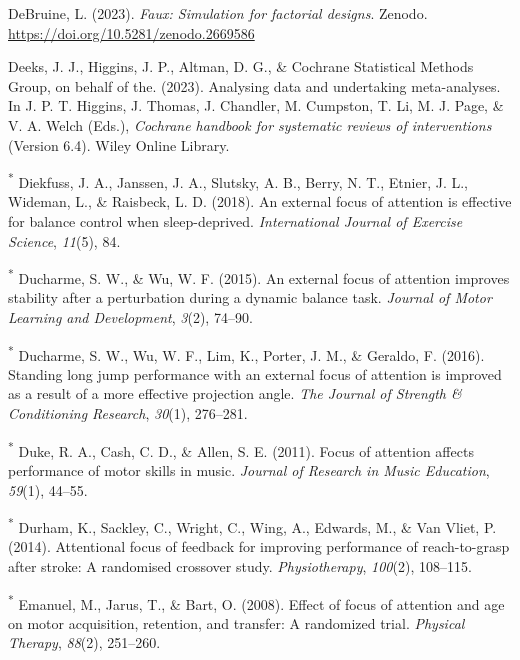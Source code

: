 \documentclass[
  man, donotrepeattitle,floatsintext]{apa7}
\newlength{\cslhangindent}
\newlength{\cslentryspacingunit} %
\newenvironment{CSLReferences}[2] %
 {%
  \setlength{\parindent}{0pt}
  \ifodd #1
  \let\oldpar\par
  \def\par{\hangindent=\cslhangindent\oldpar}
  \fi
  \setlength{\parskip}{#2\cslentryspacingunit}
 }%
 {}
\begin{document}
\begin{CSLReferences}{1}{0}
\leavevmode{}%
DeBruine, L. (2023). \emph{Faux: Simulation for factorial designs}. Zenodo. \url{https://doi.org/10.5281/zenodo.2669586}

\leavevmode{}%
Deeks, J. J., Higgins, J. P., Altman, D. G., \& Cochrane Statistical Methods Group, on behalf of the. (2023). Analysing data and undertaking meta-analyses. In J. P. T. Higgins, J. Thomas, J. Chandler, M. Cumpston, T. Li, M. J. Page, \& V. A. Welch (Eds.), \emph{Cochrane handbook for systematic reviews of interventions} (Version 6.4). Wiley Online Library.

\leavevmode{}%
\textsuperscript{*} Diekfuss, J. A., Janssen, J. A., Slutsky, A. B., Berry, N. T., Etnier, J. L., Wideman, L., \& Raisbeck, L. D. (2018). An external focus of attention is effective for balance control when sleep-deprived. \emph{International Journal of Exercise Science}, \emph{11}(5), 84.

\leavevmode{}%
\textsuperscript{*} Ducharme, S. W., \& Wu, W. F. (2015). An external focus of attention improves stability after a perturbation during a dynamic balance task. \emph{Journal of Motor Learning and Development}, \emph{3}(2), 74--90.

\leavevmode{}%
\textsuperscript{*} Ducharme, S. W., Wu, W. F., Lim, K., Porter, J. M., \& Geraldo, F. (2016). Standing long jump performance with an external focus of attention is improved as a result of a more effective projection angle. \emph{The Journal of Strength \& Conditioning Research}, \emph{30}(1), 276--281.

\leavevmode{}%
\textsuperscript{*} Duke, R. A., Cash, C. D., \& Allen, S. E. (2011). Focus of attention affects performance of motor skills in music. \emph{Journal of Research in Music Education}, \emph{59}(1), 44--55.

\leavevmode{}%
\textsuperscript{*} Durham, K., Sackley, C., Wright, C., Wing, A., Edwards, M., \& Van Vliet, P. (2014). Attentional focus of feedback for improving performance of reach-to-grasp after stroke: A randomised crossover study. \emph{Physiotherapy}, \emph{100}(2), 108--115.

\leavevmode{}%
\textsuperscript{*} Emanuel, M., Jarus, T., \& Bart, O. (2008). Effect of focus of attention and age on motor acquisition, retention, and transfer: A randomized trial. \emph{Physical Therapy}, \emph{88}(2), 251--260.


\end{CSLReferences}
\end{document}
